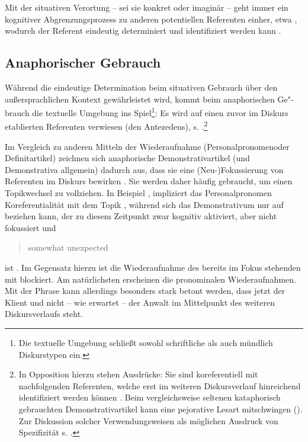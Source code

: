 Mit der situativen Verortung -- sei sie konkret oder imaginär -- geht immer ein kognitiver Abgrenzungsprozess zu anderen potentiellen Referenten einher, etwa   \parencite[vgl.][70]{Bisle-Muller1991}, wodurch der Referent eindeutig determiniert und identifiziert werden kann \parencite{Hoffmann2009}. 

 
\subsection{Anaphorischer Gebrauch}\label{sec:anaphorisch}

Während die eindeutige Determination beim situativen Gebrauch über den außersprachlichen Kontext gewährleistet wird, kommt beim anaphorischen Ge"-brauch die textuelle Umgebung ins Spiel\footnote{Die textuelle Umgebung schließt sowohl schriftliche als auch mündlich Diskurstypen ein.}: Es wird auf einen zuvor im Diskurs etablierten Referenten verwiesen (den Antezedens), s.  \parencite[vgl.][229]{Himmelmann1996}.{\footnote{In Opposition hierzu stehen  Ausdrücke: Sie sind koreferentiell mit nachfolgenden Referenten, welche erst im weiteren Diskursverlauf  hinreichend identifiziert werden können \parencite[s.][161-162]{Veldre-Gerner2007}. Beim vergleichsweise seltenen kataphorisch gebrauchten Demonstrativartikel kann eine pejorative Lesart mitschwingen (). Zur Diskussion solcher Verwendungsweisen als möglichen Ausdruck von Spezifizität s. \textcite[533]{deMulder2011}.}}

\begin{exe}
	\ex \label{ex:anaph} 
\end{exe}

Im Vergleich zu anderen Mitteln der Wiederaufnahme (Personalpronomen\linebreak oder Definitartikel) zeichnen sich anaphorische Demonstrativartikel (und Demonstrativa allgemein) dadurch aus, dass sie eine (Neu-)Fokussierung von Referenten im Diskurs bewirken \parencite [s. u.a.][]{Ehlich1979,Prince1981,Gundel1993,Comrie1997,Himmelmann1996,Diessel1999,Kibrik2011}. Sie werden daher häufig gebraucht, um einen Topikwechsel zu vollziehen. In Beispiel  \parencite[angelehnt an][96]{Diessel1999}, impliziert das Personalpronomen  Koreferentialität mit dem Topik , während sich das Demonstrativum  nur auf  beziehen kann, der zu diesem Zeitpunkt zwar kognitiv aktiviert, aber nicht fokussiert und \blockcquote[96]{Diessel1999}{somewhat unexpected} ist \parencite[vgl. hierzu][278-279]{Gundel1993}. Im Gegensatz hierzu ist die Wiederaufnahme des bereits im Fokus stehenden  mit  blockiert. Am natürlichsten erscheinen die pronominalen Wiederaufnahmen. Mit der Phrase  kann allerdings besonders stark betont werden, dass jetzt der Klient und nicht -- wie erwartet -- der Anwalt im Mittelpunkt des weiteren Diskursverlaufs steht.   

